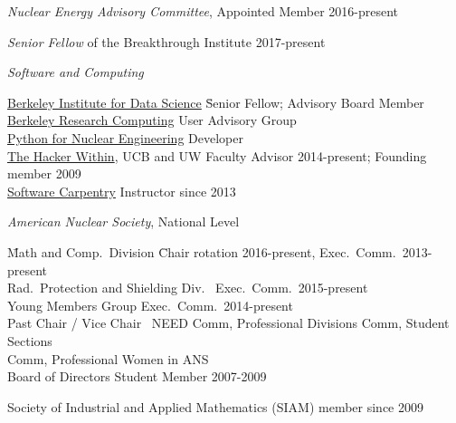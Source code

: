 \vspace*{-.25em}
\textit{Nuclear Energy Advisory Committee}, Appointed Member 2016-present

\vspace*{-.5em}
\textit{Senior Fellow} of the Breakthrough Institute 2017-present

\vspace*{-.5em}
\textit{Software and Computing}
\vspace*{-.5em}
\begin{tabbing}
\hspace*{2 em}\=\href{http://bids.berkeley.edu/}{Berkeley Institute for Data Science} \= Senior Fellow; Advisory Board Member\\
%
\>\href{http://research-it.berkeley.edu/programs/berkeley-research-computing}{Berkeley Research Computing} \> User Advisory Group\\
%
\> \href{http://pyne.io/}{Python for Nuclear Engineering}  \> Developer \\
%
\> \href{http://thehackerwithin.github.io/berkeley/}{The Hacker Within}, UCB and UW  \> Faculty Advisor 2014-present; Founding member 2009\\
%
\> \href{http://software-carpentry.org/}{Software Carpentry}  \> Instructor since 2013%
%
\end{tabbing}
%
\vspace*{-.5em}
\textit{American Nuclear Society}, National Level
\vspace*{-.5em}
\begin{tabbing}
\hspace*{2 em}\= Math and Comp.\ Division \hspace*{6em} \= Chair rotation 2016-present, Exec.\ Comm.\ 2013-present \\
%
\> Rad.\ Protection and Shielding Div.\ \> Exec.\ Comm.\ 2015-present\\
%
\> Young Members Group \> Exec.\ Comm.\ 2014-present\\
%
\> Past Chair / Vice Chair\ \> NEED Comm, Professional Divisions Comm, Student Sections\\ \> \> Comm, Professional Women in ANS\ \\
%
%
%
%
\> Board of Directors \>	Student Member 2007-2009
%
\end{tabbing}

\vspace*{-.5em}
Society of Industrial and Applied Mathematics (SIAM) member since 2009 

